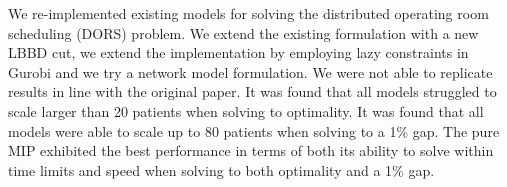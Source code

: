 We re-implemented existing models\cite{roshanaei2017propagating} for solving the distributed operating room scheduling (DORS) problem. We extend the existing formulation with a new LBBD cut, we extend the implementation by employing lazy constraints in Gurobi and we try a network model formulation. We were not able to replicate results in line with the original paper. It was found that all models struggled to scale larger than 20 patients when solving to optimality. It was found that all models were able to scale up to 80 patients when solving to a 1\% gap. The pure MIP exhibited the best performance in terms of both its ability to solve within time limits and speed when solving to both optimality and a 1\% gap. 

